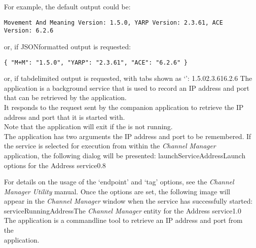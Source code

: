 \insertFullUtilityParameters{}
For example, the default output could be:
\outputBegin
\begin{verbatim}
Movement And Meaning Version: 1.5.0, YARP Version: 2.3.61, ACE Version: 6.2.6
\end{verbatim}
\outputEnd{}
or, if JSON\longDash{}formatted output is requested:
\outputBegin
\begin{verbatim}
{ "M+M": "1.5.0", "YARP": "2.3.61", "ACE": "6.2.6" }
\end{verbatim}
\outputEnd{}
or, if tab\longDash{}delimited output is requested, with tabs shown as `\tabSymbol':
\outputBegin{}
1.5.0\pseudotab{}2.3.61\pseudotab{}6.2.6
\outputEnd
{}
\secondaryEnd
\condPage
{}
The  application is a background service that is used to
record an IP address and port that can be retrieved by the 
application.\\

It responds to the  request sent by the
companion application  to retrieve the IP address and port
that it is started with.\\

Note that the application will exit if the
 is not running.\\

The application has two arguments \longDash{} the IP address and port to be remembered.
\insertAutoAppParameters
{}
\condPage
If the service is selected for execution from within the \emph{Channel Manager}
application, the following dialog will be presented:
%
{launchServiceAddress}{Launch options for the Address service}{0.8}

For details on the usage of the `endpoint' and `tag' options, see the \emph{Channel
Manager Utility} manual.
Once the options are set, the following image will appear in the \emph{Channel Manager}
window when the service has successfully started:
%
{serviceRunningAddress}{The \emph{Channel Manager} entity for the Address service}{1.0}
\condPage
{}
The  application is a command\longDash{}line tool to
retrieve an IP address and port from the\\
 application.\\

